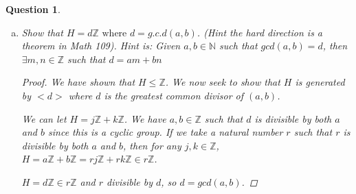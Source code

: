 \documentclass{article}
\newcommand*{\field}[1]{\mathbb{#1}}%
\newtheorem{ques}{Question}
\begin{document}
\begin{ques}
\begin{enumerate}[(a)]
\begin{proof}
			
		Thus $H \leq \field{Z}$.
		
	\end{proof}
	
	\item 
	Show that $H = d\field{Z} \text{ where } d = g.c.d(a,b)$. (Hint the hard direction is a theorem in Math 109). Hint is: Given $a,b \in \field{N}$ such that $gcd(a,b) = d$, then $\exists m,n  \in \field{Z}$ such that $d = am + bn$
	\begin{proof}

		We have shown that $H \leq \field{Z}$. We now seek to show that $H$ is generated by $<d>$ where $d$ is the greatest common divisor of $(a,b)$. 
		
		We can let $H = j\field{Z} + k\field{Z}$. We have $a,b \in \field{Z}$ such that $d$ is divisible by both $a$ and $b$ since this is a cyclic group. If we take a natural number $r$ such that $r$ is divisible by both $a$ and $b$, then for any $j,k \in \field{Z}$, $H = a\field{Z} + b\field{Z} = rj\field{Z}+ rk\field{Z} \in r\field{Z}$.
		
		$H = d\field{Z} \in r\field{Z}$ and $r$ divisible by $d$, so $d = gcd(a,b)$.
		
	\end{proof}
	
	
\end{enumerate}
\end{ques}
	
\end{document}
